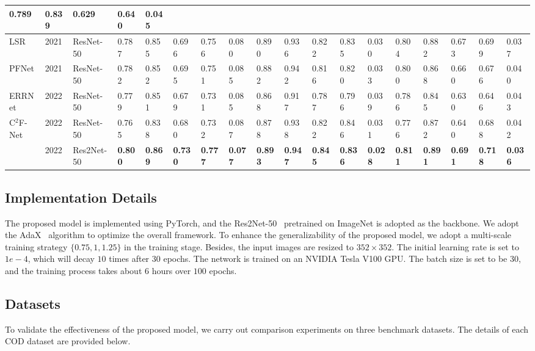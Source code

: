 \documentclass[lettersize,journal]{IEEEtran}
\newcommand{\ourM}{{C$^2$F-Net}}
\begin{document}
\begin{table*}[th]
{\begin{tabular}{l|l|l|lllll|lllll|lllll}
			0.789&0.839&0.629&0.640&0.045\\ \midrule
			LSR\cite{lsr}&2021&ResNet-50&0.787&0.855&0.696&0.756&0.080&
			0.890&0.936&0.822&0.835&0.030&
			0.804&0.882&0.673&0.699&0.037\\
			PFNet\cite{pfnet}&2021&ResNet-50&0.782&0.852&0.695&0.751&0.085&
			0.882&0.942&0.816&0.820&0.033&
			0.800&0.868&0.660&0.676&0.040\\
			ERRNet\cite{errnet}&2022&ResNet-50
			&0.779 &0.851 &0.679 &0.731 &0.085
			&0.868 &0.917 &0.787 &0.796 &0.039
			&0.786 &0.845 &0.630 &0.646 &0.043\\ 
			\midrule
			\multirow{2}{*}{\ourM}&2022&ResNet-50
			&0.765&0.838&0.680&0.732&0.087
			&0.878&0.938&0.822&0.846&0.031
			&0.776&0.872&0.640&0.688&0.042\\
			{}&2022&Res2Net-50&\textbf{0.800}&\textbf{0.869}&\textbf{0.730}&\textbf{0.777}&\textbf{0.077} &
			\textbf{0.893}&\textbf{0.947}&\textbf{0.845}&\textbf{0.836}&\textbf{0.028}&
			\textbf{0.811}&\textbf{0.891}&\textbf{0.691}&\textbf{0.718}&\textbf{0.036}\\ \bottomrule
		\end{tabular}
	}
	\label{tab1}
\end{table*}
\subsection{Implementation Details}

The proposed model is implemented using PyTorch, and the Res2Net-50~\cite{res2net} pretrained on ImageNet is adopted as the backbone. We adopt the AdaX~\cite{li2020adax} algorithm to optimize the overall framework. To enhance the generalizability of the proposed model, we adopt a multi-scale training strategy $\{0.75, 1, 1.25\}$ in the training stage. Besides, the input images are resized to $352\times{352}$. The initial learning rate is set to $1e-4$, which will decay $10$ times after $30$ epochs. The network is trained on an NVIDIA Tesla V100 GPU. The batch size is set to be $30$, and the training process takes about $6$ hours over $100$ epochs. 

\subsection{Datasets}\label{sec:Datasets}

To validate the effectiveness of the proposed model, we carry out comparison experiments on three benchmark datasets. The details of each COD dataset are provided below.
\end{document}
